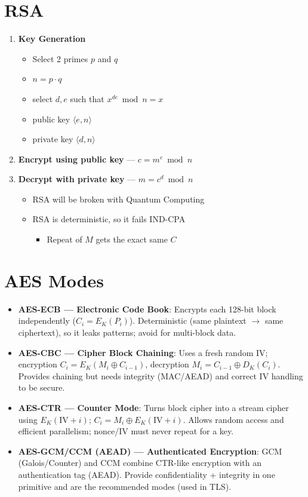 \documentclass[12pt]{article}
\begin{document}
\section{RSA}
\begin{enumerate}[label=\arabic*.]
  \item \textbf{Key Generation}
    \begin{itemize}
      \item Select 2 primes $p$ and $q$
      \item $n = p \cdot q$
      \item select $d,e$ such that $x^{de} \bmod n = x$
      \item public key $\langle e,n\rangle$
      \item private key $\langle d,n\rangle$
    \end{itemize}
  \item \textbf{Encrypt using public key} --- $c = m^e \bmod n$
  \item \textbf{Decrypt with private key} --- $m = c^d \bmod n$
    \begin{itemize}
      \item RSA will be broken with Quantum Computing
      \item RSA is deterministic, so it fails IND-CPA
      \begin{itemize}
        \item Repeat of $M$ gets the exact same $C$
      \end{itemize}
    \end{itemize}
\end{enumerate}

\hrulefill

\section{AES Modes}
\begin{itemize}
  \item \textbf{AES-ECB --- Electronic Code Book}: Encrypts each 128-bit block independently ($C_i = E_K(P_i)$). Deterministic (same plaintext $\to$ same ciphertext), so it leaks patterns; avoid for multi-block data.
  \item \textbf{AES-CBC --- Cipher Block Chaining}: Uses a fresh random IV; encryption $C_i = E_K(M_i \oplus C_{i-1})$, decryption $M_i = C_{i-1} \oplus D_K(C_i)$. Provides chaining but needs integrity (MAC/AEAD) and correct IV handling to be secure.
  \item \textbf{AES-CTR --- Counter Mode}: Turns block cipher into a stream cipher using $E_K(\text{IV} + i)$; $C_i = M_i \oplus E_K(\text{IV}+i)$. Allows random access and efficient parallelism; nonce/IV must never repeat for a key.
  \item \textbf{AES-GCM/CCM (AEAD) --- Authenticated Encryption}: GCM (Galois/Counter) and CCM combine CTR-like encryption with an authentication tag (AEAD). Provide confidentiality + integrity in one primitive and are the recommended modes (used in TLS).
\end{itemize}
\end{document}
